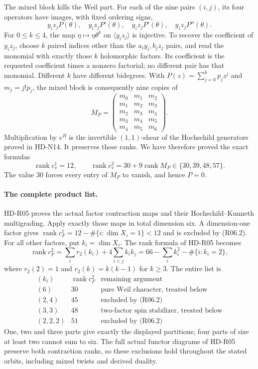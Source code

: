 The mixed block kills the Weil part. For each of the nine pairs
$(i,j)$, its four operators have images, with fixed ordering signs,
\[
 y_i z_jP(\theta),\quad y_i z_jP'(\theta),\quad
 y_i z_jP'(\theta),\quad y_i z_jP''(\theta).
\]
For $0\le k\le4$, the map
$\eta\mapsto\eta\theta^k$ on $\langle y_i z_j\rangle$ is
injective. To recover the coefficient of $y_i z_j$, choose $k$
paired indices other than the $a_i y_i,b_j z_j$ pairs, and read
the monomial with exactly those $k$ holomorphic factors. Its
coefficient is the requested coefficient times a nonzero factorial;
no different pair has that monomial. Different $k$ have different
bidegrees. With $P(z)=\sum_{j=0}^6p_jz^j$ and $m_j=j!p_j$, the
mixed block is consequently nine copies of
\[
 M_P=\begin{pmatrix}
 m_0&m_1&m_2\\m_1&m_2&m_3\\m_2&m_3&m_4\\
 m_3&m_4&m_5\\m_4&m_5&m_6
 \end{pmatrix}.
\]
Multiplication by $e^B$ is the invertible $(1,1)$-shear of the
Hochschild generators proved in HD-N14. It preserves these ranks.
We have therefore proved the exact formulas
\[
 \operatorname{rank}c_v^1=12,\qquad
 \operatorname{rank}c_v^2=30+9\operatorname{rank}M_P
                              \in\{30,39,48,57\}.             \tag{R06.2}
\]
The value $30$ forces every entry of $M_P$ to vanish, and hence
$P=0$.

\paragraph{The complete product list.}
HD-R05 proves the actual factor contraction maps and their
Hochschild--Kunneth multigrading. Apply exactly those maps in total
dimension six. A dimension-one factor gives
$\operatorname{rank}c_F^1=12-\#\{i:\dim X_i=1\}<12$ and is
excluded by (R06.2). For all other factors, put $k_i=\dim X_i$.
The rank formula of HD-R05 becomes
\[
 \operatorname{rank}c_F^2
 =\sum_i r_2(k_i)+4\sum_{i<j}k_i k_j
 =66-\sum_i k_i^2-\#\{i:k_i=2\},                            \tag{R06.3}
\]
where $r_2(2)=1$ and $r_2(k)=k(k-1)$ for $k\ge3$.
The entire list is
\[
\begin{array}{c|r|l}
 (k_i)&\operatorname{rank}c_F^2&\text{remaining argument}\\\hline
 (6)&30&\text{pure Weil character, treated below}\\
 (2,4)&45&\text{excluded by (R06.2)}\\
 (3,3)&48&\text{two-factor spin stabilizer, treated below}\\
 (2,2,2)&51&\text{excluded by (R06.2)}
\end{array}                                                   \tag{R06.4}
\]
One, two and three parts give exactly the displayed partitions;
four parts of size at least two cannot sum to six.
The full actual functor diagrams of HD-R05 preserve both
contraction ranks, so these exclusions hold throughout the stated
orbits, including mixed twists and derived duality.

